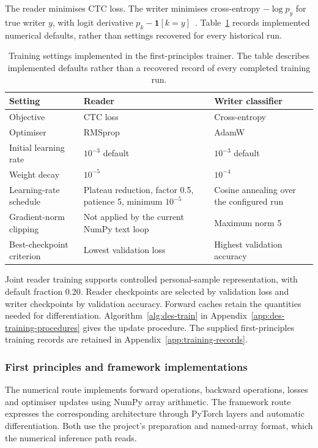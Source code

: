 The reader minimises CTC loss. The writer minimises cross-entropy $-\log p_y$ for true writer $y$, with logit derivative $p_k-\mathbf1[k=y]$~\cite[p.~6]{graves2013}. Table~\ref{tab:des-training} records implemented numerical defaults, rather than settings recovered for every historical run.
\begin{table}[!htbp]\centering\small
\begin{tabularx}{\linewidth}{|l|X|X|}
\hline\textbf{Setting}&\textbf{Reader}&\textbf{Writer classifier}\\\hline
Objective&CTC loss&Cross-entropy\\\hline
Optimiser&RMSprop&AdamW\\\hline
Initial learning rate&$10^{-3}$ default&$10^{-3}$ default\\\hline
Weight decay&$10^{-5}$&$10^{-4}$\\\hline
Learning-rate schedule&Plateau reduction, factor 0.5, patience 5, minimum $10^{-5}$&Cosine annealing over the configured run\\\hline
Gradient-norm clipping&Not applied by the current NumPy text loop&Maximum norm 5\\\hline
Best-checkpoint criterion&Lowest validation loss&Highest validation accuracy\\\hline
\end{tabularx}
\caption{Training settings implemented in the first-principles trainer. The table describes implemented defaults rather than a recovered record of every completed training run.}
\label{tab:des-training}
\end{table}

Joint reader training supports controlled personal-sample representation, with default fraction 0.20. Reader checkpoints are selected by validation loss and writer checkpoints by validation accuracy. Forward caches retain the quantities needed for differentiation. Algorithm~\ref{alg:des-train} in Appendix~\ref{app:des-training-procedures} gives the update procedure. The supplied first-principles training records are retained in Appendix~\ref{app:training-records}.

\subsubsection{First principles and framework implementations}
\label{sec:des-implementations}
The numerical route implements forward operations, backward operations, losses and optimiser updates using NumPy array arithmetic. The framework route expresses the corresponding architecture through PyTorch layers and automatic differentiation. Both use the project's preparation and named-array format, which the numerical inference path reads.


